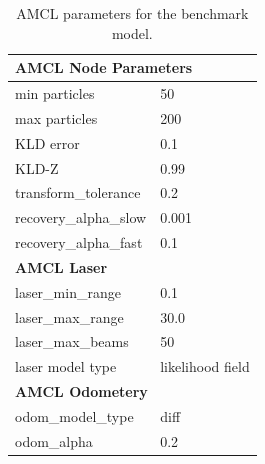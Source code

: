 \documentclass[10pt,journal,compsoc]{IEEEtran}
\begin{document}
\begin{table}[ht]
\caption{AMCL parameters for the benchmark model.}
\label{tab:AMCLparam-Udacitybot}
\begin{center}
    \begin{tabular}{ll}
        \toprule%
    \multicolumn{2}{l}{\textbf{AMCL Node Parameters}} \\
    \midrule
    min particles              & 50                   \\
    max particles              & 200                  \\
    KLD error                  & 0.1                  \\
    KLD-Z                      & 0.99                 \\
    transform\_tolerance       & 0.2                  \\
    recovery\_alpha\_slow      & 0.001                \\
    recovery\_alpha\_fast      & 0.1                  \\
    \midrule
    \multicolumn{2}{l}{\textbf{AMCL Laser}}           \\
    \midrule
    laser\_min\_range          & 0.1                  \\
    laser\_max\_range          & 30.0                 \\
    laser\_max\_beams          & 50                   \\
    laser model type           & likelihood field     \\
    \midrule
    \multicolumn{2}{l}{\textbf{AMCL Odometery}}       \\
    \midrule
    odom\_model\_type          & diff                 \\
    odom\_alpha                & 0.2                   \\
    \bottomrule
    \end{tabular}
\end{center}
\end{table}
\end{document}
